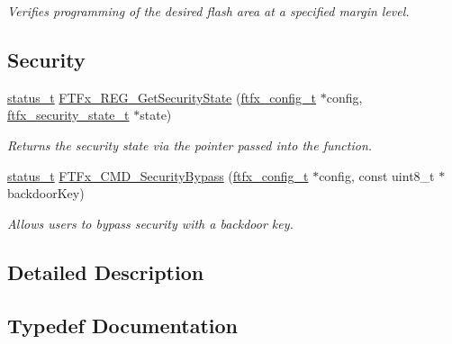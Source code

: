 \begin{DoxyCompactItemize}
\begin{DoxyCompactList}\small\item\em Verifies programming of the desired flash area at a specified margin level. \end{DoxyCompactList}\end{DoxyCompactItemize}
\subsection*{Security}
\begin{DoxyCompactItemize}
\item 
\mbox{\hyperlink{group__ksdk__common_gaaabdaf7ee58ca7269bd4bf24efcde092}{status\+\_\+t}} \mbox{\hyperlink{group__ftfx__controller_ga219f5ec71c7fed8f684297ef0a693262}{F\+T\+Fx\+\_\+\+R\+E\+G\+\_\+\+Get\+Security\+State}} (\mbox{\hyperlink{group__ftfx__controller_gab0196063c05bffb4cd2f249699a3378c}{ftfx\+\_\+config\+\_\+t}} $\ast$config, \mbox{\hyperlink{group__ftfx__controller_gae49df85d158f3651e17d1bb660a4f1c2}{ftfx\+\_\+security\+\_\+state\+\_\+t}} $\ast$state)
\begin{DoxyCompactList}\small\item\em Returns the security state via the pointer passed into the function. \end{DoxyCompactList}\item 
\mbox{\hyperlink{group__ksdk__common_gaaabdaf7ee58ca7269bd4bf24efcde092}{status\+\_\+t}} \mbox{\hyperlink{group__ftfx__controller_gaa909192c42276b7d70e6a91a5cb93a71}{F\+T\+Fx\+\_\+\+C\+M\+D\+\_\+\+Security\+Bypass}} (\mbox{\hyperlink{group__ftfx__controller_gab0196063c05bffb4cd2f249699a3378c}{ftfx\+\_\+config\+\_\+t}} $\ast$config, const uint8\+\_\+t $\ast$backdoor\+Key)
\begin{DoxyCompactList}\small\item\em Allows users to bypass security with a backdoor key. \end{DoxyCompactList}\end{DoxyCompactItemize}


\subsection{Detailed Description}


\subsection{Typedef Documentation}
\mbox{\label{group__ftfx__controller_gab0196063c05bffb4cd2f249699a3378c}} 
